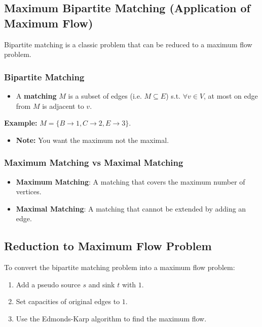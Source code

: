 \subsection{Maximum Bipartite Matching (Application of Maximum Flow)}
\begin{definition}
    Bipartite matching is a classic problem that can be reduced to a maximum flow problem.
\end{definition}

\subsubsection{Bipartite Matching}
\begin{definition}
    \begin{itemize}
        \item A \textbf{matching} $M$ is a subset of edges (i.e. $M \subseteq E$) s.t. $\forall v \in V$, at most on edge from $M$ is adjacent to $v$.
    \end{itemize}
\end{definition}

\begin{example}
    \textbf{Example:} $M = \{B \rightarrow 1, C \rightarrow 2, E \rightarrow 3\}$.
    \begin{itemize}
        \item \textbf{Note:} You want the maximum not the maximal.
    \end{itemize}
\end{example}

\subsubsection{Maximum Matching vs Maximal Matching}
\begin{definition}
    \begin{itemize}
        \item \textbf{Maximum Matching}: A matching that covers the maximum number of vertices.
        \item \textbf{Maximal Matching}: A matching that cannot be extended by adding an edge.
    \end{itemize}
\end{definition}

\subsection{Reduction to Maximum Flow Problem}
\begin{process}
    To convert the bipartite matching problem into a maximum flow problem:
    \begin{enumerate}
        \item Add a pseudo source $s$ and sink $t$ with $1$.
        \item Set capacities of original edges to $1$.
        \item Use the Edmonds-Karp algorithm to find the maximum flow.
    \end{enumerate}

    

\end{process}


